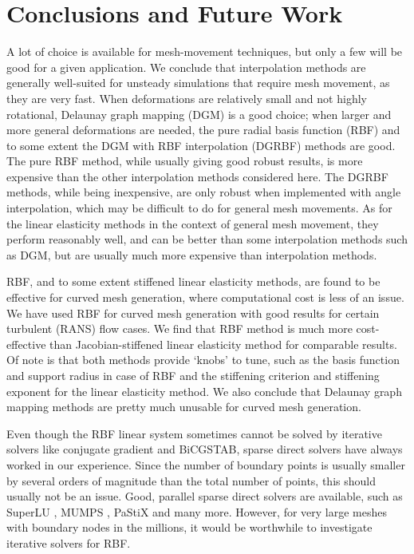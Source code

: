 \chapter{Conclusions and Future Work}

A lot of choice is available for mesh-movement techniques, but only a few will be good for a given application. We conclude that interpolation methods are generally well-suited for unsteady simulations that require mesh movement, as they are very fast. When deformations are relatively small and not highly rotational, Delaunay graph mapping (DGM) is a good choice; when larger and more general deformations are needed, the pure radial basis function (RBF) and to some extent the DGM with RBF interpolation (DGRBF) methods are good. The pure RBF method, while usually giving good robust results, is more expensive than the other interpolation methods considered here. The DGRBF methods, while being inexpensive, are only robust when implemented with angle interpolation, which may be difficult to do for general mesh movements. As for the linear elasticity methods in the context of general mesh movement, they perform reasonably well, and can be better than some interpolation methods such as DGM, but are usually much more expensive than interpolation methods.

RBF, and to some extent stiffened linear elasticity methods, are found to be effective for curved mesh generation, where computational cost is less of an issue. We have used RBF for curved mesh generation with good results for certain turbulent (RANS) flow cases. We find that RBF method is much more cost-effective than Jacobian-stiffened linear elasticity method for comparable results. Of note is that both methods provide `knobs' to tune, such as the basis function and support radius in case of RBF and the stiffening criterion and stiffening exponent for the linear elasticity method. We also conclude that Delaunay graph mapping methods are pretty much unusable for curved mesh generation.

Even though the RBF linear system sometimes cannot be solved by iterative solvers like conjugate gradient and BiCGSTAB, sparse direct solvers have always worked in our experience. Since the number of boundary points is usually smaller by several orders of magnitude than the total number of points, this should usually not be an issue. Good, parallel sparse direct solvers are available, such as SuperLU \cite{superlu}, MUMPS \cite{MUMPS}, PaStiX \cite{pastix} and many more. However, for very large meshes with boundary nodes in the millions, it would be worthwhile to investigate iterative solvers for RBF.

